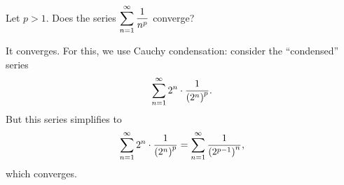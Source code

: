 \begin{example}
Let $p > 1$.  Does the series $\displaystyle\sum_{n=1}^\infty \displaystyle\frac{1}{n^p}$ converge?
\end{example}

\begin{solution}
  It converges.  For this, we use Cauchy condensation: consider the ``condensed'' series
$$
\displaystyle\sum_{n=1}^\infty 2^n \cdot \displaystyle\frac{1}{\left( 2^n \right)^p}.
$$
But this series simplifies to
$$
\displaystyle\sum_{n=1}^\infty 2^n \cdot \displaystyle\frac{1}{\left( 2^n \right)^p} =
\displaystyle\sum_{n=1}^\infty  \displaystyle\frac{1}{\left( 2^{p-1} \right)^n},
$$
which converges.
\end{solution}

